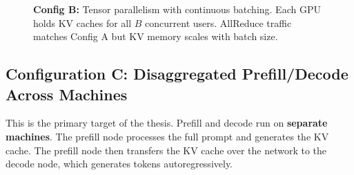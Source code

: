 \documentclass[11pt]{article}
\begin{document}
\begin{figure}[ht]
\centering
{}
\caption{\textbf{Config B:} Tensor parallelism with continuous batching. Each GPU holds KV caches for all $B$ concurrent users. AllReduce traffic matches Config A but KV memory scales with batch size.}
\end{figure}

\subsection{Configuration C: Disaggregated Prefill/Decode Across Machines}
\label{sec:config_c}

This is the primary target of the thesis. Prefill and decode run on \textbf{separate machines}. The prefill node processes the full prompt and generates the KV cache. The prefill node then transfers the KV cache over the network to the decode node, which generates tokens autoregressively.
\end{document}

